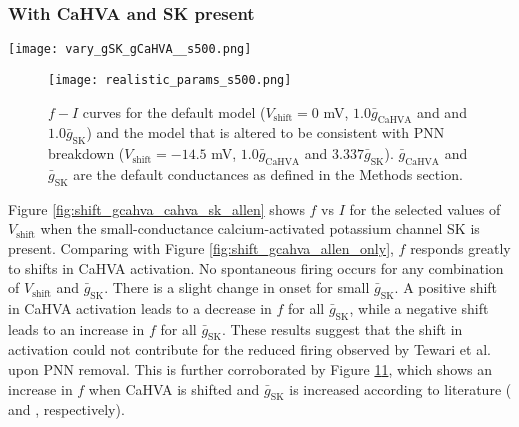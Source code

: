 \documentclass[times, twoside]{zHenriquesLab-StyleBioRxiv}
\begin{document}
\subsubsection*{With CaHVA and SK present}

\begin{figure*}
\centering
\texttt{[image: vary\_gSK\_gCaHVA\_\_s500.png]}
\caption{$f-I$ curves for different shifts $V_\text{shift}$ of the activation curve for different values of $\bar{g}_\text{SK}$. A) 0.1$\bar{g}_\text{SK}$, B) 0.5$\bar{g}_\text{SK}$, C) 1.0$\bar{g}_\text{SK}$, D) 2.0$\bar{g}_\text{SK}$. $\bar{g}_\text{SK}$ is the default value from the Allen Brain Atlas' cell model.}
\label{fig:shift_gcahva_cahva_sk_allen}
\end{figure*}

\begin{figure}%
\centering
\texttt{[image: realistic\_params\_s500.png]}
\caption{$f-I$ curves for the default model ($V_\text{shift}=0$ mV, $1.0\bar{g}_\text{CaHVA}$ and and $1.0\bar{g}_\text{SK}$) and the model that is altered to be consistent with PNN breakdown ($V_\text{shift}=-14.5$ mV, $1.0\bar{g}_\text{CaHVA}$ and $3.337\bar{g}_\text{SK}$). $\bar{g}_\text{CaHVA}$ and  $\bar{g}_\text{SK}$ are the default conductances as defined in the Methods section.}
\label{fig:shift_realisticparams}
\end{figure}

Figure \ref{fig:shift_gcahva_cahva_sk_allen} shows $f$ vs $I$ for the selected values of $V_\text{shift}$ when the small-conductance calcium-activated potassium channel SK is present. Comparing with Figure \ref{fig:shift_gcahva_allen_only}, $f$ responds greatly to shifts in CaHVA activation. No spontaneous firing occurs for any combination of $V_\text{shift}$ and $\bar{g}_\text{SK}$. There is a slight change in onset for small $\bar{g}_\text{SK}$. A positive shift in CaHVA activation leads to a decrease in $f$ for all $\bar{g}_\text{SK}$, while a negative shift leads to an increase in $f$ for all $\bar{g}_\text{SK}$. These results suggest that the shift in activation could not contribute for the reduced firing observed by Tewari et al. \cite{tewari_perineuronal_2018} upon PNN removal. This is further corroborated by Figure \ref{fig:shift_realisticparams}\ref{fig:shift_realisticparams}, which shows an increase in $f$ when CaHVA is shifted and $\bar{g}_\text{SK}$ is increased according to literature (\cite{vigetti_chondroitin_2008} and \cite{dembitskaya_attenuation_2021}, respectively). %
\end{document}
